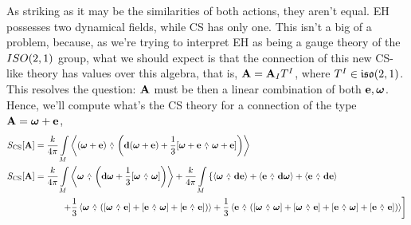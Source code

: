 As striking as it may be the similarities of both actions, they aren't equal. EH possesses two dynamical fields, while CS has only one. This isn't 
a big of a problem, because, as we're trying to interpret EH as being a gauge theory of the $ISO\qty(2,1)$ group, what we should expect is that the connection of 
this new CS-like theory has values over this algebra, that is, $\vb A=\vb A_IT^I$, where $T^I\in\mathfrak{iso}\qty(2,1)$. This resolves the question: $\vb A$ must be then a 
linear combination of both $\vb e,\boldsymbol\omega$. Hence, we'll compute what's the CS theory for a connection of the type $\vb A=\boldsymbol\omega+\vb e$,
\begin{align*}
    S_{\textnormal{CS}}\qty[\vb A]&=\frac{k}{4\pi}\int\limits_M\expval{\qty(\boldsymbol\omega+\vb e)\ \wedgecomma\ \qty(\vb d{\qty(\boldsymbol\omega+\vb e)}+\frac13\wedgecomm{\boldsymbol\omega+\vb e}{\boldsymbol\omega+\vb e})}\\
    S_{\textnormal{CS}}\qty[\vb A]&=\frac{k}{4\pi}\int\limits_M\expval{\boldsymbol\omega\ \wedgecomma\ \qty(\vb d\boldsymbol\omega+\frac13\wedgecomm{\boldsymbol\omega}{\boldsymbol\omega})}+\frac{k}{4\pi}\int\limits_M\left\{\expval{\boldsymbol\omega\ \wedgecomma\ \vb d{\vb e}}+\expval{\vb e\ \wedgecomma\ \vb d{\boldsymbol\omega}}+\expval{\vb e\ \wedgecomma\ \vb d{\vb e}}\right.\\
    &\quad\quad\quad\left.+\frac13\expval{\boldsymbol\omega\ \wedgecomma\ \qty(\wedgecomm{\boldsymbol\omega}{\vb e}+\wedgecomm{\vb e}{\boldsymbol\omega}+\wedgecomm{\vb e}{\vb e})}+\frac13\expval{\vb e\ \wedgecomma\ \qty(\wedgecomm{\boldsymbol\omega}{\boldsymbol\omega}+\wedgecomm{\boldsymbol\omega}{\vb e}+\wedgecomm{\vb e}{\boldsymbol\omega}+\wedgecomm{\vb e}{\vb e})}\right]
\end{align*}

